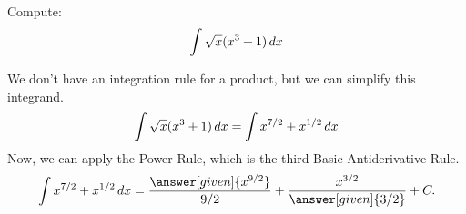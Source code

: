 \documentclass{ximera}
\begin{document}
\begin{example}
Compute:
\[
\int \sqrt{x}(x^3+1) \mathop{}\!d x
\]
\begin{explanation}
We don't have an integration rule for a product, but we can simplify this integrand. 
\begin{align*}
  \int \sqrt{x}(x^3+1) \mathop{}\!d x &=\int x^{7/2}+x^{1/2} \mathop{}\!d x\\
\end{align*}
Now, we can apply the Power Rule, which is the third Basic Antiderivative Rule.
\[
\int x^{7/2}+x^{1/2} \d x= \dfrac{\answer[given]{x^{9/2}}}{9/2}+ \frac{x^{3/2}}{\answer[given]{3/2}} + C.
\]
\end{explanation}
\end{example}

%
\end{document}
